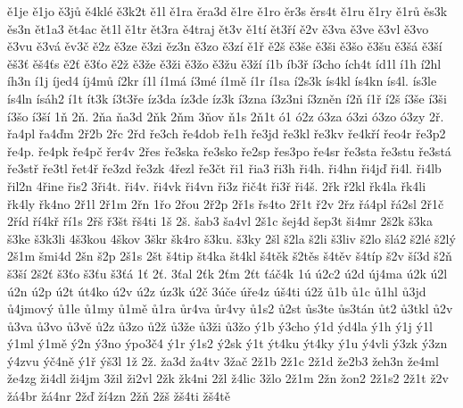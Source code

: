 {ě1je
ě1jo
ě3jů
ě4klé
ě3k2t
ě1l
ě1ra
ěra3d
ě1re
ě1ro
ěr3s
ěrs4t
ě1ru
ě1ry
ě1rů
ěs3k
ěs3n
ět1a3
ět4ac
ět1l
ě1tr
ět3ra
ě4traj
ět3v
ě1tí
ět3ří
ě2v
ě3va
ě3ve
ě3vl
ě3vo
ě3vu
ě3vá
ěv3č
ě2z
ě3ze
ě3zi
ěz3n
ě3zo
ě3zí
ě1ř
ě2š
ě3še
ě3ši
ě3šo
ě3šu
ě3šá
ě3ší
ěš3ť
ěš4ťs
ě2ť
ě3ťo
ě2ž
ě3že
ě3ži
ě3žo
ě3žu
ě3ží
í1b
íb3ř
í3cho
ích4t
íd1l
í1h
í2hl
íh3n
í1j
íjed4
íj4mů
í2kr
í1l
í1má
í3mé
í1mě
í1r
í1sa
í2s3k
ís4kl
ís4kn
ís4l.
ís3le
ís4ln
ísáh2
í1t
ít3k
í3t3ře
íz3da
íz3de
íz3k
í3zna
í3z3ni
í3zněn
í2ň
í1ř
í2š
í3še
í3ši
í3šo
í3ší
1ň
2ň.
2ňa
ňa3d
2ňk
2ňm
3ňov
ň1s
2ň1t
ó1
ó2z
ó3za
ó3zi
ó3zo
ó3zy
2ř.
řa4pl
řa4ďm
2ř2b
2řc
2řd
ře3ch
ře4dob
ře1h
ře3jd
ře3kl
ře3kv
ře4kří
řeo4r
ře3p2
ře4p.
ře4pk
ře4pč
řer4v
2řes
ře3ska
ře3sko
ře2sp
řes3po
ře4sr
ře3sta
ře3stu
ře3stá
ře3stř
ře3tl
řet4ř
ře3zd
ře3zk
4řezl
ře3čt
ři1
řia3
ři3h
ři4h.
ři4hn
ři4jď
ři4l.
ři4lb
řil2n
4řine
řis2
3ři4t.
ři4v.
ři4vk
ři4vn
ři3z
řič4t
ři3ř
ři4š.
2řk
ř2kl
řk4la
řk4li
řk4ly
řk4no
2ř1l
2ř1m
2řn
1řo
2řou
2ř2p
2ř1s
řs4to
2ř1t
ř2v
2řz
řá4pl
řá2sl
2ř1č
2říd
ří4kř
ří1s
2řš
ř3št
řš4ti
1š
2š.
šab3
ša4vl
2š1c
šej4d
šep3t
ši4mr
2š2k
š3ka
š3ke
š3k3li
4š3kou
4škov
3škr
šk4ro
š3ku.
š3ky
2šl
š2la
š2li
š3liv
š2lo
šlá2
š2lé
š2lý
2š1m
šmi4d
2šn
š2p
2š1s
2št
š4tip
št4ka
št4kl
š4těk
š2těs
š4těv
š4típ
š2v
ší3d
š2ň
š3ší
2š2ť
š3ťo
š3ťu
š3ťá
1ť
2ť.
3ťal
2ťk
2ťm
2ťt
ťáč4k
1ú
ú2c2
ú2d
új4ma
ú2k
ú2l
ú2n
ú2p
ú2t
út4ko
ú2v
ú2z
úz3k
ú2č
3úče
úře4z
úš4ti
ú2ž
ů1b
ů1c
ů1hl
ů3jd
ů4jmový
ů1le
ů1my
ů1mě
ů1ra
ůr4va
ůr4vy
ů1s2
ů2st
ůs3te
ůs3tán
ůt2
ů3tkl
ů2v
ů3va
ů3vo
ů3vě
ů2z
ů3zo
ů2ž
ů3že
ů3ži
ů3žo
ý1b
ý3cho
ý1d
ýd4la
ý1h
ý1j
ý1l
ý1ml
ý1mě
ý2n
ý3no
ýpo3č4
ý1r
ý1s2
ý2sk
ý1t
ýt4ku
ýt4ky
ý1u
ý4vli
ý3zk
ý3zn
ý4zvu
ýč4ně
ý1ř
ýš3l
1ž
2ž.
ža3d
ža4tv
3žač
2ž1b
2ž1c
2ž1d
že2b3
žeh3n
že4ml
že4zg
ži4dl
ži4jm
3žil
ži2vl
2žk
žk4ni
2žl
ž4lic
3žlo
2ž1m
2žn
žon2
2ž1s2
2ž1t
ž2v
žá4br
žá4nr
2žď
ží4zn
2žň
2žš
žš4ti
žš4tě
}
%

